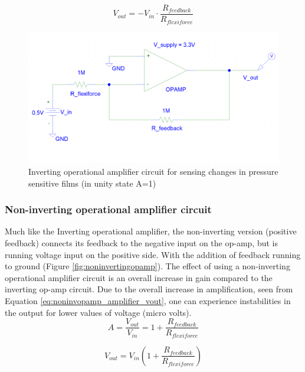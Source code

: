 \begin{equation}
\label{eq:invopamp_amplifier_vout}
    V_{out}= -V_{in} \cdot \frac{R_{feedback}}{R_{flexiforce}}
\end{equation}

\begin{figure}
    \centering
    \includegraphics[scale=0.3]{figures/inverting_opamp.png}
    \caption{Inverting operational amplifier circuit for sensing changes in pressure sensitive films (in unity state A=1)}
    \label{fig:invertingopamp}
\end{figure}


\subsubsection{Non-inverting operational amplifier circuit}
Much like the Inverting operational amplifier, the non-inverting version (positive feedback) connects its feedback to the negative input on the op-amp, but is running voltage input on the positive side. With the addition of feedback running to ground (Figure \ref{fig:noninvertingopamp}). The effect of using a non-inverting operational amplifier circuit is an overall increase in gain compared to the inverting op-amp circuit. Due to the overall increase in amplification, seen from Equation \ref{eq:noninvopamp_amplifier_vout}, one can experience instabilities in the output for lower values of voltage (micro volts).
\begin{equation}
\label{eq:noninvopamp_amplifier}
    A = \frac{V_{out}}{V_{in}} = 1 + \frac{R_{feedback}}{R_{flexiforce}}
\end{equation}

\begin{equation}
\label{eq:noninvopamp_amplifier_vout}
    V_{out} = V_{in}(1 + \frac{R_{feedback}}{R_{flexiforce}})
\end{equation}

